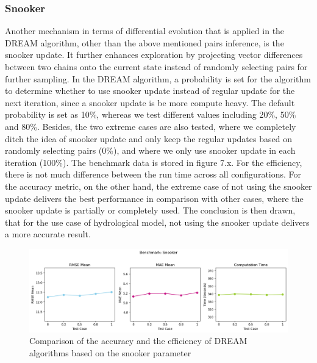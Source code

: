 \subsubsection{Snooker}
Another mechanism in terms of differential evolution that is applied in the DREAM algorithm, other than the above mentioned pairs inference, is the snooker update. It further enhances exploration by projecting vector differences between two chains onto the current state instead of randomly selecting pairs for further sampling. In the DREAM algorithm, a probability is set for the algorithm to determine whether to use snooker update instead of regular update for the next iteration, since a snooker update is be more compute heavy. The default probability is set as 10\%, whereas we test different values including 20\%, 50\% and 80\%. Besides, the two extreme cases are also tested, where we completely ditch the idea of snooker update and only keep the regular updates based on randomly selecting pairs (0\%), and where we only use snooker update in each iteration (100\%). The benchmark data is stored in figure 7.x. For the efficiency, there is not much difference between the run time across all configurations. For the accuracy metric, on the other hand, the extreme case of not using the snooker update delivers the best performance in comparison with other cases, where the snooker update is partially or completely used. The conclusion is then drawn, that for the use case of hydrological model, not using the snooker update delivers a more accurate result.
\begin{figure}[H]
    \centering
    \includegraphics[width=1\textwidth]{figures/dream/snooker.png}
    \captionsetup{width=.8\textwidth}
    \caption{Comparison of the accuracy and the efficiency of DREAM algorithms based on the snooker parameter}
    \label{fig:enter-label}
\end{figure}

